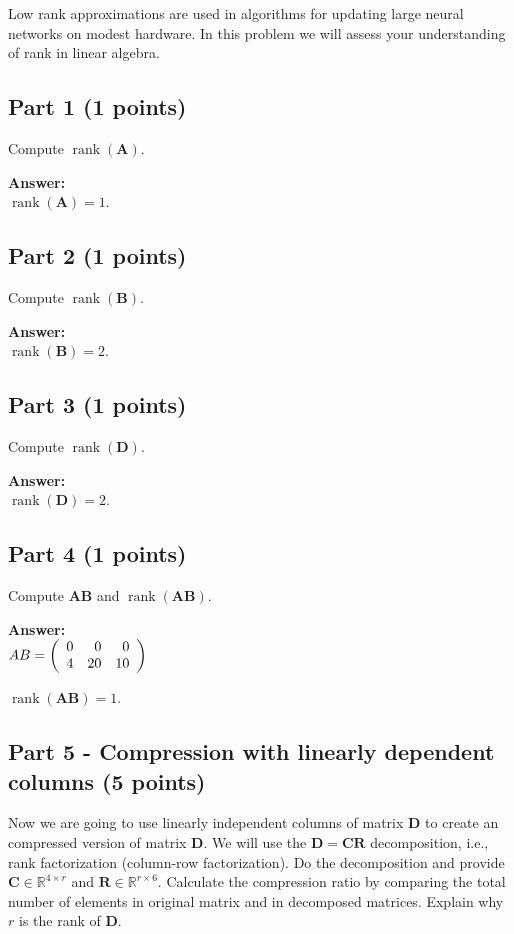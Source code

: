 \documentclass[11pt, oneside]{article}   	%
\begin{document}
Low rank approximations are used in algorithms for updating large neural networks on modest hardware. In this problem we will assess your understanding of rank in linear algebra.


\subsection*{Part 1 (1 points)}
Compute $\operatorname{rank}(\mathbf{A})$.

\textbf{Answer:} \\
$\operatorname{rank}(\mathbf{A}) = 1$.

\subsection*{Part 2 (1 points)}
Compute $\operatorname{rank}(\mathbf{B})$.

\textbf{Answer:} \\
$\operatorname{rank}(\mathbf{B}) = 2$.

\subsection*{Part 3 (1 points)}
Compute $\operatorname{rank}(\mathbf{D})$.  

\textbf{Answer:} \\
$\operatorname{rank}(\mathbf{D}) = 2$.

\subsection*{Part 4 (1 points)}
Compute $\mathbf{AB}$ and $\operatorname{rank}(\mathbf{AB})$.  

\textbf{Answer:} \\
$AB = \left( {\begin{array}{*{20}r}
    0 & 0 & 0  \\
    4 & 20 & 10  \\
 \end{array}} \right)
$

$\operatorname{rank}(\mathbf{AB}) = 1$.


\subsection*{Part 5 - Compression with linearly dependent columns (5 points)}
Now we are going to use linearly independent columns of matrix $\mathbf{D}$ to create an compressed version of matrix $\mathbf{D}$. We will use the $\mathbf{D} = \mathbf{CR}$ decomposition, i.e., rank factorization  (column-row factorization). Do the decomposition and provide $\mathbf{C} \in \mathbb{R}^{4 \times r}$ and $\mathbf{R} \in \mathbb{R}^{r \times 6}$. Calculate the compression ratio by comparing the total number of elements in original matrix and in decomposed matrices. Explain why $r$ is the rank of $\mathbf{D}$.
\end{document}
